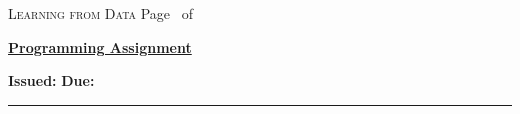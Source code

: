 \documentclass[a4paper, 12pt, answers]{exam}
\begin{document}
\pagestyle{headandfoot}
\runningheadrule


\setcounter{psctr}{3} %

              {\textsc{Learning from Data}}
              { Page \thepage\ of \numpages}
\firstpagefooter{}{}{}
\runningfooter{}{}{}


\newenvironment{Sequation}
   {\stepcounter{Sequ}%
     \addtocounter{equation}{-1}%
     \renewcommand\theequation{S\arabic{Sequ}}\equation}
   {\endequation}

\centering

\centering
\renewcommand{\thequestion}{\arabic{psctr}.\arabic{question}}
\courseheader

\begin{center}
  \underline{\bf Programming Assignment \thepsctr} \\
\end{center}
\begin{flushleft}
  \textbf{Issued:}  \hfill
  \textbf{Due:}  
\end{flushleft}

\hrule 



\vspace{1em}


\end{document}
